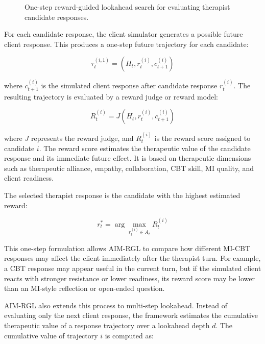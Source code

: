 \begin{figure}[htbp]
{
}
\caption{One-step reward-guided lookahead search for evaluating therapist candidate responses.}
\label{fig:one_step_lookahead}
\end{figure}

For each candidate response, the client simulator generates a possible future client response. This produces a one-step future trajectory for each candidate:

\[
\tau_t^{(i,1)} = (H_t, r_t^{(i)}, c_{t+1}^{(i)})
\]

where \(c_{t+1}^{(i)}\) is the simulated client response after candidate response \(r_t^{(i)}\). The resulting trajectory is evaluated by a reward judge or reward model:

\[
R_t^{(i)} = J(H_t, r_t^{(i)}, c_{t+1}^{(i)})
\]

where \(J\) represents the reward judge, and \(R_t^{(i)}\) is the reward score assigned to candidate \(i\). The reward score estimates the therapeutic value of the candidate response and its immediate future effect. It is based on therapeutic dimensions such as therapeutic alliance, empathy, collaboration, CBT skill, MI quality, and client readiness.

The selected therapist response is the candidate with the highest estimated reward:

\[
r_t^* = \arg\max_{r_t^{(i)} \in A_t} R_t^{(i)}
\]

This one-step formulation allows AIM-RGL to compare how different MI-CBT responses may affect the client immediately after the therapist turn. For example, a CBT response may appear useful in the current turn, but if the simulated client reacts with stronger resistance or lower readiness, its reward score may be lower than an MI-style reflection or open-ended question.

AIM-RGL also extends this process to multi-step lookahead. Instead of evaluating only the next client response, the framework estimates the cumulative therapeutic value of a response trajectory over a lookahead depth \(d\). The cumulative value of trajectory \(i\) is computed as:

